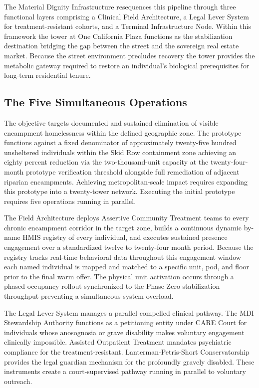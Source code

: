 \documentclass[12pt, letterpaper]{article}
\begin{document}
The Material Dignity Infrastructure resequences this pipeline through three functional layers comprising a Clinical Field Architecture, a Legal Lever System for treatment-resistant cohorts, and a Terminal Infrastructure Node. Within this framework the tower at One California Plaza functions as the stabilization destination bridging the gap between the street and the sovereign real estate market. Because the street environment precludes recovery the tower provides the metabolic gateway required to restore an individual's biological prerequisites for long-term residential tenure.

\subsection{The Five Simultaneous Operations}

The objective targets documented and sustained elimination of visible encampment homelessness within the defined geographic zone. The prototype functions against a fixed denominator of approximately twenty-five hundred unsheltered individuals within the Skid Row containment zone achieving an eighty percent reduction via the two-thousand-unit capacity at the twenty-four-month prototype verification threshold alongside full remediation of adjacent riparian encampments. Achieving metropolitan-scale impact requires expanding this prototype into a twenty-tower network. Executing the initial prototype requires five operations running in parallel.

The Field Architecture deploys Assertive Community Treatment teams to every chronic encampment corridor in the target zone, builds a continuous dynamic by-name HMIS registry of every individual, and executes sustained presence engagement over a standardized twelve to twenty-four month period. Because the registry tracks real-time behavioral data throughout this engagement window each named individual is mapped and matched to a specific unit, pod, and floor prior to the final warm offer. The physical unit activation occurs through a phased occupancy rollout synchronized to the Phase Zero stabilization throughput preventing a simultaneous system overload.

The Legal Lever System manages a parallel compelled clinical pathway. The MDI Stewardship Authority functions as a petitioning entity under CARE Court for individuals whose anosognosia or grave disability makes voluntary engagement clinically impossible. Assisted Outpatient Treatment mandates psychiatric compliance for the treatment-resistant. Lanterman-Petris-Short Conservatorship provides the legal guardian mechanism for the profoundly gravely disabled. These instruments create a court-supervised pathway running in parallel to voluntary outreach.
\end{document}

